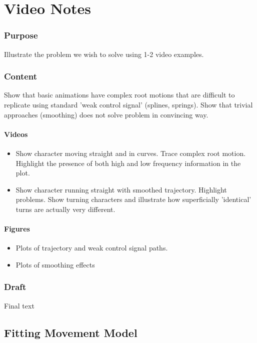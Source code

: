 \section{Video Notes}

\subsubsection{Purpose}
Illustrate the problem we wish to solve using 1-2 video examples.
\subsubsection{Content}
Show that basic animations have complex root motions that are difficult to replicate using standard 'weak control signal' (splines, springs). 
Show that trivial approaches (smoothing) does not solve problem in convincing way.
\paragraph{Videos}
\begin{itemize}
    \item Show character moving straight and in curves. Trace complex root motion. Highlight the presence of both high and low frequency information in the plot.
    \item Show character running straight with smoothed trajectory. Highlight problems. Show turning characters and illustrate how superficially 'identical' turns are actually very different.
\end{itemize}
\paragraph{Figures}
\begin{itemize}
    \item Plots of trajectory and weak control signal paths.
    \item Plots of smoothing effects
\end{itemize}

\subsubsection{Draft}
Final text

\subsection{Fitting Movement Model}
